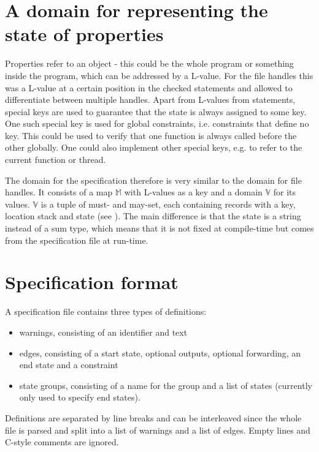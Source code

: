 \section{A domain for representing the state of properties}
Properties refer to an object - this could be the whole program or something inside the program, which can be addressed by a L-value. For the file handles this was a L-value at a certain position in the checked statements and allowed to differentiate between multiple handles.
Apart from L-values from statements, special keys are used to guarantee that the state is always assigned to some key.
One such special key is used for global constraints, i.e. constraints that define no key. This could be used to verify that one function is always called before the other globally. One could also implement other special keys, e.g. to refer to the current function or thread.

The domain for the specification therefore is very similar to the domain for file handles. It consists of a map $\mathbb{M}$ with L-values as a key and a domain $\mathbb{V}$ for its values. $\mathbb{V}$ is a tuple of must- and may-set, each containing records with a key, location stack and state (see ).
The main difference is that the state is a string instead of a sum type, which means that it is not fixed at compile-time but comes from the specification file at run-time.


\section{Specification format}
A specification file contains three types of definitions:
\begin{itemize}
\item warnings, consisting of an identifier and text
\item edges, consisting of a start state, optional outputs, optional forwarding, an end state and a constraint
\item state groups, consisting of a name for the group and a list of states (currently only used to specify end states).
\end{itemize}
Definitions are separated by line breaks and can be interleaved since the whole file is parsed and split into a list of warnings and a list of edges. Empty lines and C-style comments are ignored.

